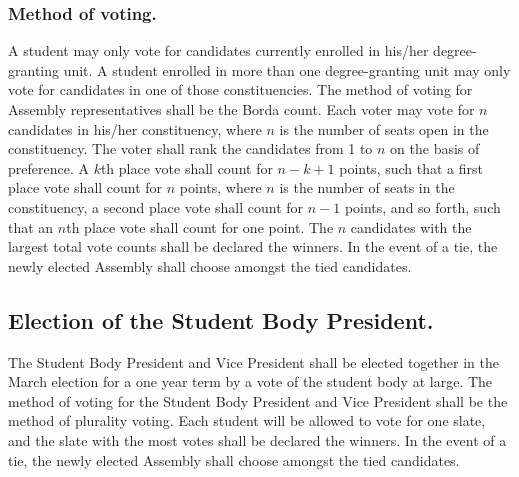 \subsubsection{Method of voting.}  A student may only vote for candidates currently enrolled in his/her degree-granting unit.  A student enrolled in more than one degree-granting unit may only vote for candidates in one of those constituencies.  The method of voting for Assembly representatives shall be the Borda count.  Each voter may vote for $n$ candidates in his/her constituency, where $n$ is the number 
of seats open in the constituency. The voter shall rank the candidates from 
1 to $n$ on the basis of preference.  A $k$th place vote shall count for $n-k+1$ points, such that a first place vote shall count for $n$ points, where $n$ 
is the number of seats in the constituency, a second place vote shall count 
for $n-1$ points, and so forth, such that an $n$th place vote shall count for one point.  The $n$ candidates with the largest total vote counts shall be declared the winners.  In the event of a tie, the newly elected Assembly shall choose amongst the tied candidates.

\subsection{Election of the Student Body President.}
The Student Body President and Vice President shall be elected together in the March election for a one year term by a vote of the student body at large.  The method of voting for the Student Body President and Vice President shall be the method of plurality voting.  Each student will be allowed to vote for one slate, and the slate with the most votes shall be declared the winners.  In the event of a tie, the newly elected Assembly shall choose amongst the tied candidates.